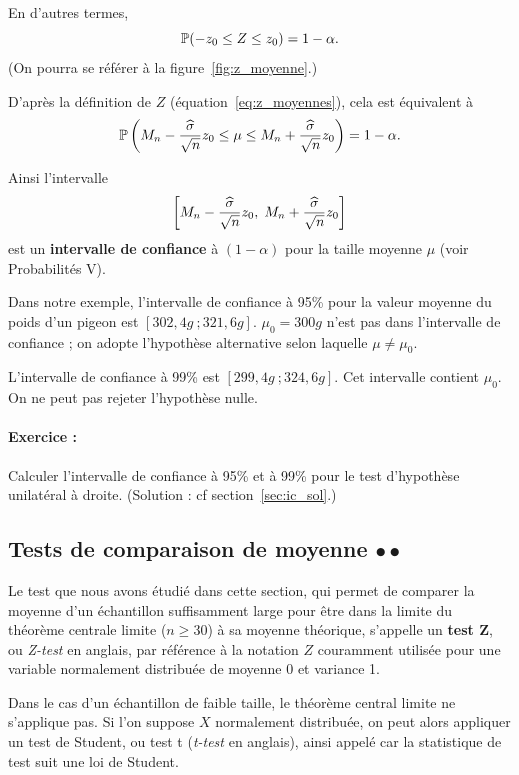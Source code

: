En d'autres termes, 
\[
  \mathbb{P}(-z_0 \leq Z \leq z_0) = 1 - \alpha. 
\]
(On pourra se référer à la figure~\ref{fig:z_moyenne}.)

D'après la définition de $Z$ (équation~\eqref{eq:z_moyennes}), cela est équivalent à 
\[
  \mathbb{P}\left( M_n - \frac{{\widehat \sigma}}{\sqrt{n}} z_0 \leq 
    \mu \leq M_n + \frac{{\widehat \sigma}}{\sqrt{n}}z_0 \right) = 1 - \alpha.
\]

Ainsi l'intervalle 
\[
  \left[ M_n - \frac{{\widehat \sigma}}{\sqrt{n}} z_0, \; M_n +
    \frac{{\widehat \sigma}}{\sqrt{n}} z_0 \right]
\]
est un \textbf{intervalle de confiance} à $(1 - \alpha)$ pour la taille moyenne
$\mu$ (voir Probabilités V).

Dans notre exemple, l'intervalle de confiance à 95\% pour la valeur moyenne du
poids d'un pigeon est $[302,4\si{g}~; 321,6\si{g}]$.
$\mu_0 = 300\si{g}$ n'est pas dans l'intervalle de confiance ; on adopte l'hypothèse
alternative selon laquelle $\mu \neq \mu_0.$

L'intervalle de confiance à 99\% est $[299,4\si{g}~; 324,6\si{g}].$ Cet
intervalle contient $\mu_0$. On ne peut pas rejeter l'hypothèse nulle.

\paragraph{Exercice :} Calculer l'intervalle de confiance à 95\% et à 99\% pour
le test d'hypothèse unilatéral à droite. (Solution : cf section~\ref{sec:ic_sol}.)

\subsection{Tests de comparaison de moyenne $\bullet \bullet$} 
Le test que nous avons étudié dans cette section, qui permet de comparer la
moyenne d'un échantillon suffisamment large pour être dans la limite du
théorème centrale limite ($n \geq 30$) à sa moyenne théorique, s'appelle un
\textbf{test Z}, ou \textit{Z-test} en anglais, par référence à la notation $Z$
couramment utilisée pour une variable normalement distribuée de moyenne 0 et
variance 1.

Dans le cas d'un échantillon de faible taille, le théorème central limite ne
s'applique pas. Si l'on suppose $X$ normalement distribuée, on peut alors
appliquer un test de Student, ou test t (\textit{t-test} en anglais), ainsi
appelé car la statistique de test suit une loi de Student.


